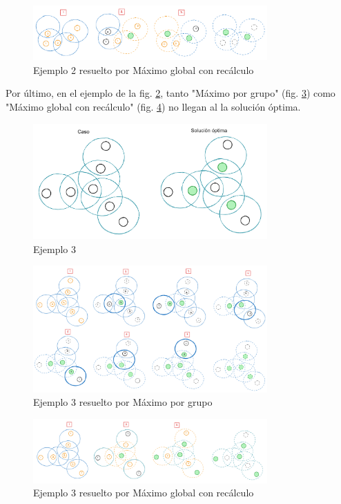 \begin{figure}[H]
    \centering
    \includegraphics[width=0.8\textwidth]{img/greedy_ej2_mgr.png}
    \caption{Ejemplo 2 resuelto por Máximo global con recálculo}
    \label{fig:greedy_ej2_mgr}
\end{figure}

Por último, en el ejemplo de la fig. \ref{fig:greedy_ej3}, tanto "Máximo por grupo" (fig. \ref{fig:greedy_ej3_mpg}) como "Máximo global con recálculo" (fig. \ref{fig:greedy_ej3_mgr}) no llegan al la solución óptima.

\begin{figure}[H]
    \centering
    \includegraphics[width=0.8\textwidth]{img/greedy_ej3.png}
    \caption{Ejemplo 3}
    \label{fig:greedy_ej3}
\end{figure}

\begin{figure}[H]
    \centering
    \includegraphics[width=0.8\textwidth]{img/greedy_ej3_mpg.png}
    \caption{Ejemplo 3 resuelto por Máximo por grupo}
    \label{fig:greedy_ej3_mpg}
\end{figure}

\begin{figure}[H]
    \centering
    \includegraphics[width=0.8\textwidth]{img/greedy_ej3_mgr.png}
    \caption{Ejemplo 3 resuelto por Máximo global con recálculo}
    \label{fig:greedy_ej3_mgr}
\end{figure}